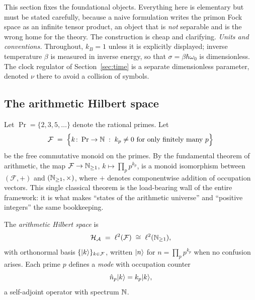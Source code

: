 This section fixes the foundational objects. Everything here is elementary but must be stated
carefully, because a naive formulation writes the primon Fock space as an infinite tensor
product, an object that is \emph{not} separable and is the wrong home for the theory. The
construction is cheap and clarifying. \emph{Units and conventions.} Throughout,
$k_{B}=1$ unless it is explicitly displayed; inverse temperature $\beta$ is measured in
inverse energy, so that $\sigma=\beta\hbar\omega_{0}$ is dimensionless. The clock regulator
of Section~\ref{sec:time} is a separate dimensionless parameter, denoted $\nu$ there to avoid
a collision of symbols.

\subsection{The arithmetic Hilbert space}

Let $\Pr=\{2,3,5,\dots\}$ denote the rational primes. Let
\begin{equation}\label{eq:monoid}
\mathcal{F}\;=\;\Bigl\{k\colon \Pr\to\mathbb{N} \;:\; k_{p}\neq 0 \text{ for only finitely many } p\Bigr\}
\end{equation}
be the free commutative monoid on the primes. By the fundamental theorem of arithmetic, the
map $\mathcal{F}\to\mathbb{N}_{\geq 1}$, $k\mapsto \prod_{p}p^{k_{p}}$, is a monoid isomorphism
between $(\mathcal{F},+)$ and $(\mathbb{N}_{\geq 1},\times)$, where $+$ denotes componentwise addition
of occupation vectors. This single classical theorem is the load-bearing wall of the entire
framework: it is what makes ``states of the arithmetic universe'' and ``positive integers''
the same bookkeeping.

\begin{definition}\label{def:hilbert}
The \emph{arithmetic Hilbert space} is
\begin{equation}
\mathcal{H}_{\mathcal{A}}\;=\;\ell^{2}(\mathcal{F})\;\cong\;\ell^{2}(\mathbb{N}_{\geq 1}),
\end{equation}
with orthonormal basis $\{\lvert k\rangle\}_{k\in\mathcal{F}}$, written $\lvert n\rangle$ for
$n=\prod_{p}p^{k_{p}}$ when no confusion arises. Each prime $p$ defines a \emph{mode} with
occupation counter
\begin{equation}
\hat n_{p}\lvert k\rangle=k_{p}\lvert k\rangle,
\end{equation}
a self-adjoint operator with spectrum $\mathbb{N}$.
\end{definition}

